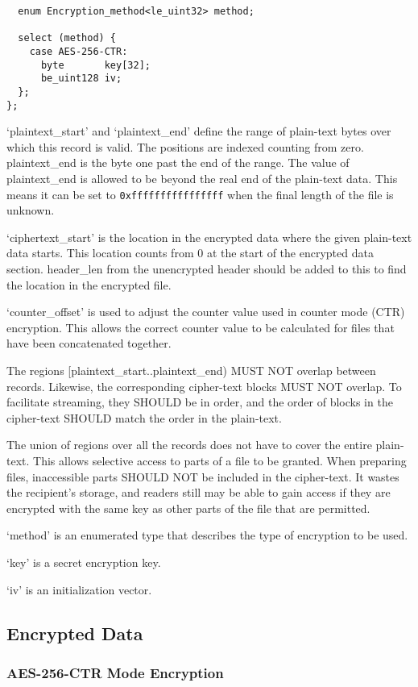 \documentclass[10pt]{article}
\begin{document}
{\begin{verbatim}
  enum Encryption_method<le_uint32> method;

  select (method) {
    case AES-256-CTR:
      byte       key[32];
      be_uint128 iv;
  };
};
\end{verbatim}

`plaintext\_start' and `plaintext\_end' define the range of plain-text bytes over which this record is valid.
The positions are indexed counting from zero.
plaintext\_end is the byte one past the end of the range.
The value of plaintext\_end is allowed to be beyond the real end of the plain-text data.
This means it can be set to \verb+0xffffffffffffffff+ when the final length of the file is unknown.

`ciphertext\_start' is the location in the encrypted data where the given plain-text data starts.
This location counts from 0 at the start of the encrypted data section.
header\_len from the unencrypted header should be added to this to find the location in the encrypted file.

`counter\_offset' is used to adjust the counter value used in counter mode (CTR) encryption.
This allows the correct counter value to be calculated for files that have been concatenated together.

The regions [plaintext\_start..plaintext\_end) MUST NOT overlap between records.
Likewise, the corresponding cipher-text blocks MUST NOT overlap.
To facilitate streaming, they SHOULD be in order, and the order of blocks in the cipher-text SHOULD match the order
in the plain-text.

The union of regions over all the records does not have to cover the entire plain-text.
This allows selective access to parts of a file to be granted.
When preparing files, inaccessible parts SHOULD NOT be included in the cipher-text.
It wastes the recipient's storage, and readers still may be able to gain access if they are encrypted with the same key
as other parts of the file that are permitted.

`method' is an enumerated type that describes the type of encryption to be used.

`key' is a secret encryption key.

`iv' is an initialization vector.

\subsection{Encrypted Data}
\subsubsection{AES-256-CTR Mode Encryption}

}
\end{document}
